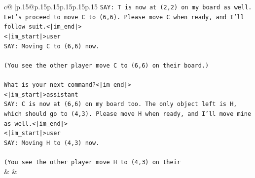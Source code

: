 \documentclass{article}
\begin{document}
{\begin{supertabular}{c@{$\;$}|p{.15\linewidth}@{}p{.15\linewidth}p{.15\linewidth}p{.15\linewidth}p{.15\linewidth}p{.15\linewidth}}
{{{\texttt{SAY: T is now at (2,2) on my board as well. Let's proceed to move C to (6,6). Please move C when ready, and I'll follow suit.<|im\_end|>} \\
\texttt{<|im\_start|>user} \\
\texttt{SAY: Moving C to (6,6) now.} \\
\\ 
\texttt{(You see the other player move C to (6,6) on their board.)} \\
\\ 
\texttt{What is your next command?<|im\_end|>} \\
\texttt{<|im\_start|>assistant} \\
\texttt{SAY: C is now at (6,6) on my board too. The only object left is H, which should go to (4,3). Please move H when ready, and I'll move mine as well.<|im\_end|>} \\
\texttt{<|im\_start|>user} \\
\texttt{SAY: Moving H to (4,3) now.} \\
\\ 
\texttt{(You see the other player move H to (4,3) on their} \\
            }
        }
    }
    & & \\ \\


\end{supertabular}}
\end{document}
